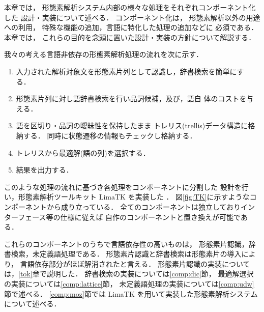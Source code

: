 本章では，
形態素解析システム内部の様々な処理をそれぞれコンポーネント化した
設計・実装について述べる．
コンポーネント化は，
形態素解析以外の用途への利用，
特殊な機能の追加，言語に特化した処理の追加などに
必須である．
本章では，
これらの目的を念頭に置いた設計・実装の方針について解説する．

我々の考える言語非依存の形態素解析処理の流れを次に示す．
\begin{enumerate}
\item 入力された解析対象文を形態素片列として認識し，辞書検索を簡単にす
  る．
\item 形態素片列に対し語辞書検索を行い品詞候補，及び，語自
  体のコストを与える．
\item 語を区切り・品詞の曖昧性を保持したまま
  トレリス(trellis)データ構造に格納する．
  同時に状態遷移の情報もチェックし格納する．
\item
  
  トレリスから最適解(語の列)を選択する．
\item 結果を出力する．
\end{enumerate}
このような処理の流れに基づき各処理をコンポーネントに分割した
設計を行い，形態素解析ツールキット LimaTK を実装した
\cite{LimaTK99}\cite{山下and松本98}\cite{山下99}．
図\ref{fig:TK}に示すようなコンポーネントから成り立っている．
全てのコンポーネントは独立しておりインターフェース等の仕様に従えば
自作のコンポーネントと置き換えが可能である．

これらのコンポーネントのうちで言語依存性の高いものは，
形態素片認識，辞書検索，未定義語処理である．
形態素片認識と辞書検索は形態素片の導入により，
言語依存部分がほぼ解消されたと言える．
形態素片認識の実装については，\ref{tok}章で説明した．
辞書検索の実装については\ref{comp:dic}節，
最適解選択の実装については\ref{comp:lattice}節，
未定義語処理の実装については\ref{comp:udw}節で述べる．
\ref{comp:moz}節では LimaTK を用いて実装した形態素解析システム \moz
について述べる．

